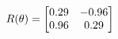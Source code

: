 \documentclass[preview]{standalone}
\begin{document}
\begin{align*}
\special{dvisvgm:raw <g id='unique000'>}R(\theta) = \begin{bmatrix}0.29 & -0.96\\0.96 & 0.29\end{bmatrix}\special{dvisvgm:raw </g>}
\end{align*}
\end{document}
